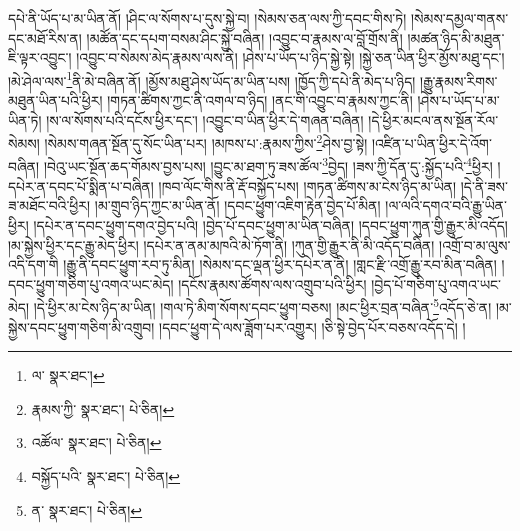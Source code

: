 དཔེ་ནི་ཡོད་པ་མ་ཡིན་ནོ། །ཤིང་ལ་སོགས་པ་དུས་སྐྱེ་བ། །སེམས་ཅན་ལས་ཀྱི་དབང་གིས་ཏེ། །སེམས་དམྱལ་གནས་དང་མཐོ་རིས་ན། །མཚོན་དང་དཔག་བསམ་ཤིང་སྐྱེ་བཞིན། །འབྱུང་བ་རྣམས་ལ་བློ་གྲོས་ནི། །མཚན་ཉིད་མི་མཐུན་ཇི་ལྟར་འབྱུང་། །འབྱུང་བ་སེམས་མེད་རྣམས་ལས་ནི། །ཤེས་པ་ཡོད་པ་ཉིད་སྐྱེ་སྟེ། །སྐྱེ་ཅན་ཡིན་ཕྱིར་མྱོས་མཐུ་དང་། །མེ་ཤེལ་ལས་\footnote{ལ་  སྣར་ཐང་། }ནི་མེ་བཞིན་ནོ། །མྱོས་མཐུ་ཤེས་ཡོད་མ་ཡིན་པས། །ཁྱོད་ཀྱི་དཔེ་ནི་མེད་པ་ཉིད། །རྒྱུ་རྣམས་རིགས་མཐུན་ཡིན་པའི་ཕྱིར། །གཏན་ཚིགས་ཀྱང་ནི་འགལ་བ་ཉིད། །ནང་གི་འབྱུང་བ་རྣམས་ཀྱང་ནི། །ཤེས་པ་ཡོད་པ་མ་ཡིན་ཏེ། །ས་ལ་སོགས་པའི་དངོས་ཕྱིར་དང་། །འབྱུང་བ་ཡིན་ཕྱིར་དེ་གཞན་བཞིན། །དེ་ཕྱིར་མངལ་ནས་སྔོན་རོལ་སེམས། །སེམས་གཞན་སྔོན་དུ་སོང་ཡིན་པར། །མཁས་པ་:རྣམས་ཀྱིས་\footnote{རྣམས་ཀྱི་  སྣར་ཐང་།  པེ་ཅིན། }ཤེས་བྱ་སྟེ། །འཛིན་པ་ཡིན་ཕྱིར་དེ་འོག་བཞིན། །བེའུ་ཡང་སྔོན་ཆད་གོམས་བྱས་པས། །བྱུང་མ་ཐག་ཏུ་ཟས་ཚོལ་\footnote{འཚོལ་  སྣར་ཐང་།  པེ་ཅིན། }བྱེད། །ཟས་ཀྱི་དོན་དུ་:སྐྱོད་པའི་\footnote{བསྐྱོད་པའི་  སྣར་ཐང་།  པེ་ཅིན། }ཕྱིར། །དཔེར་ན་དབང་པོ་སྨིན་པ་བཞིན། །ཁབ་ལོང་གིས་ནི་རྡོ་བསྐྱོད་པས། །གཏན་ཚིགས་མ་ངེས་ཉིད་མ་ཡིན། །དེ་ནི་ཟས་ཟ་མཐོང་བའི་ཕྱིར། །མ་གྲུབ་ཉིད་ཀྱང་མ་ཡིན་ནོ། །དབང་ཕྱུག་འཇིག་རྟེན་བྱེད་པོ་མིན། །ལ་ལའི་དགའ་བའི་རྒྱུ་ཡིན་ཕྱིར། །དཔེར་ན་དབང་ཕྱུག་དགའ་བྱེད་པའི། །བྱེད་པོ་དབང་ཕྱུག་མ་ཡིན་བཞིན། །དབང་ཕྱུག་ཀུན་གྱི་རྒྱུར་མི་འདོད། །མ་སྐྱེས་ཕྱིར་དང་རྒྱུ་མེད་ཕྱིར། །དཔེར་ན་ནམ་མཁའི་མེ་ཏོག་ནི། །ཀུན་གྱི་རྒྱུར་ནི་མི་འདོད་བཞིན། །འགྲོ་བ་མ་ལུས་འདི་དག་གི །རྒྱུ་ནི་དབང་ཕྱུག་རབ་ཏུ་མིན། །སེམས་དང་ལྡན་ཕྱིར་དཔེར་ན་ནི། །གླང་རྫི་འགྲོ་རྒྱུ་རབ་མིན་བཞིན། །དབང་ཕྱུག་གཅིག་པུ་འགའ་ཡང་མེད། །དངོས་རྣམས་ཚོགས་ལས་འགྲུབ་པའི་ཕྱིར། །བྱེད་པོ་གཅིག་པུ་འགའ་ཡང་མེད། །དེ་ཕྱིར་མ་ངེས་ཉིད་མ་ཡིན། །གལ་ཏེ་མིག་སོགས་དབང་ཕྱུག་བཅས། །མང་ཕྱིར་བྲན་བཞིན་\footnote{ན་  སྣར་ཐང་།  པེ་ཅིན། }འདོད་ཅེ་ན། །མ་སྐྱེས་དབང་ཕྱུག་གཅིག་མི་འགྲུབ། །དབང་ཕྱུག་དེ་ལས་ཟློག་པར་འགྱུར། །ཅི་སྟེ་བྱེད་པོར་བཅས་འདོད་དེ། །
